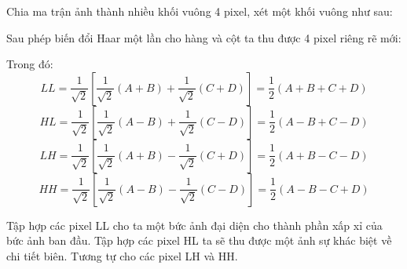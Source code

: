 Chia ma trận ảnh thành nhiều khối vuông 4 pixel, xét một khối vuông như sau:
\begin{figure}[H]
    \centering
    \vspace{0.3cm}
\end{figure}
Sau phép biến đổi Haar một lần cho hàng và cột ta thu được 4 pixel riêng rẽ mới:
\begin{figure}[H]
    \centering
    \vspace{0.3cm}
\end{figure}
Trong đó:
$$LL = \frac{1}{\sqrt{2}} \left[ \frac{1}{\sqrt{2}}(A+B)+\frac{1}{\sqrt{2}}(C+D) \right] =\frac{1}{2}(A+B+C+D)$$
$$HL = \frac{1}{\sqrt{2}} \left[ \frac{1}{\sqrt{2}}(A-B) + \frac{1}{\sqrt{2}}(C-D) \right] = \frac{1}{2}(A-B+C-D)$$
$$LH = \frac{1}{\sqrt{2}} \left[ \frac{1}{\sqrt{2}}(A+B) - \frac{1}{\sqrt{2}}(C+D) \right] = \frac{1}{2}(A+B-C-D)$$
$$HH = \frac{1}{\sqrt{2}} \left[ \frac{1}{\sqrt{2}}(A-B) - \frac{1}{\sqrt{2}}(C-D) \right] = \frac{1}{2}(A-B-C+D)$$

Tập hợp các pixel LL cho ta một bức ảnh đại diện cho thành phần xấp xỉ của bức ảnh ban đầu. 
Tập hợp các pixel HL ta sẽ thu được một ảnh sự khác biệt về chi tiết biên. Tương tự cho các pixel LH và HH. 

